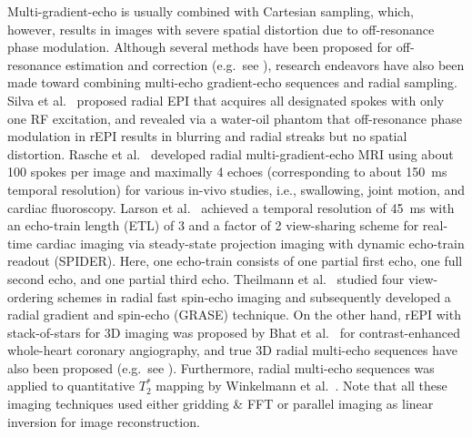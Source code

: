 Multi-gradient-echo is usually combined with Cartesian sampling, which, however, results in images with severe spatial distortion due to off-resonance phase modulation. Although several methods have been proposed for off-resonance estimation and correction (e.g.~see \cite{1999_off-reson_cor,1999_EPI_off-reson_MEGE,2004_fim_est_spiral,2005_Toeplitz_fim_cor,2008_fim_est,2008_r2s_fm_fMRI,2009_fim_t2s_me_TMI,2012_ORACLE,2014_fim_est}), research endeavors have also been made toward combining multi-echo gradient-echo sequences and radial sampling. Silva et al.~\cite{1998_rEPI} proposed radial EPI that acquires all designated spokes with only one RF excitation, and revealed via a water-oil phantom that off-resonance phase modulation in rEPI results in blurring and radial streaks but no spatial distortion. Rasche et al.~\cite{1999_prMGE} developed radial multi-gradient-echo MRI using about \num{100} spokes per image and maximally \num{4} echoes (corresponding to about \SI{150}{\ms} temporal resolution) for various in-vivo studies, i.e., swallowing, joint motion, and cardiac fluoroscopy. Larson et al.~\cite{2001_SPIDER} achieved a temporal resolution of \SI{45}{\ms} with an echo-train length (\acs{ETL}) of \num{3} and a factor of 2 view-sharing scheme for real-time cardiac imaging via steady-state projection imaging with dynamic echo-train readout (SPIDER). Here, one echo-train consists of one partial first echo, one full second echo, and one partial third echo. Theilmann et al.~\cite{2004_vo_rFSE,2005_rGRASE} studied four view-ordering schemes in radial fast spin-echo imaging and subsequently developed a radial gradient and spin-echo (GRASE) technique. On the other hand, rEPI with stack-of-stars for 3D imaging was proposed by Bhat et al.~\cite{2011_MRA_rEPI} for contrast-enhanced whole-heart coronary angiography, and true 3D radial multi-echo sequences have also been proposed (e.g.~see \cite{2005_3D_rMHE,2010_3D_rME,2013_MRA_rME}). Furthermore, radial multi-echo sequences was applied to quantitative $T_2^*$ mapping by Winkelmann et al.~\cite{2006_R2s_rMGE}. Note that all these imaging techniques used either gridding \& FFT or parallel imaging as linear inversion for image reconstruction.

